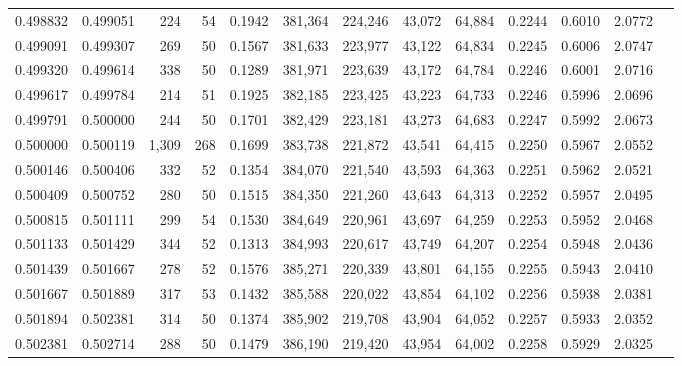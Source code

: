 \begin{tabular}{rrrrrrrrrrrrr}
0.498832 & 0.499051 &    224 &    54 &                                     0.1942 & 381,364 & 224,246 &  43,072 &  64,884 & 0.2244 & 0.6010 & 2.0772 \\
0.499091 & 0.499307 &    269 &    50 &                                     0.1567 & 381,633 & 223,977 &  43,122 &  64,834 & 0.2245 & 0.6006 & 2.0747 \\
0.499320 & 0.499614 &    338 &    50 &                                     0.1289 & 381,971 & 223,639 &  43,172 &  64,784 & 0.2246 & 0.6001 & 2.0716 \\
0.499617 & 0.499784 &    214 &    51 &                                     0.1925 & 382,185 & 223,425 &  43,223 &  64,733 & 0.2246 & 0.5996 & 2.0696 \\
0.499791 & 0.500000 &    244 &    50 &                                     0.1701 & 382,429 & 223,181 &  43,273 &  64,683 & 0.2247 & 0.5992 & 2.0673 \\
0.500000 & 0.500119 &  1,309 &   268 &                                     0.1699 & 383,738 & 221,872 &  43,541 &  64,415 & 0.2250 & 0.5967 & 2.0552 \\
0.500146 & 0.500406 &    332 &    52 &                                     0.1354 & 384,070 & 221,540 &  43,593 &  64,363 & 0.2251 & 0.5962 & 2.0521 \\
0.500409 & 0.500752 &    280 &    50 &                                     0.1515 & 384,350 & 221,260 &  43,643 &  64,313 & 0.2252 & 0.5957 & 2.0495 \\
0.500815 & 0.501111 &    299 &    54 &                                     0.1530 & 384,649 & 220,961 &  43,697 &  64,259 & 0.2253 & 0.5952 & 2.0468 \\
0.501133 & 0.501429 &    344 &    52 &                                     0.1313 & 384,993 & 220,617 &  43,749 &  64,207 & 0.2254 & 0.5948 & 2.0436 \\
0.501439 & 0.501667 &    278 &    52 &                                     0.1576 & 385,271 & 220,339 &  43,801 &  64,155 & 0.2255 & 0.5943 & 2.0410 \\
0.501667 & 0.501889 &    317 &    53 &                                     0.1432 & 385,588 & 220,022 &  43,854 &  64,102 & 0.2256 & 0.5938 & 2.0381 \\
0.501894 & 0.502381 &    314 &    50 &                                     0.1374 & 385,902 & 219,708 &  43,904 &  64,052 & 0.2257 & 0.5933 & 2.0352 \\
0.502381 & 0.502714 &    288 &    50 &                                     0.1479 & 386,190 & 219,420 &  43,954 &  64,002 & 0.2258 & 0.5929 & 2.0325 \\

\end{tabular}
